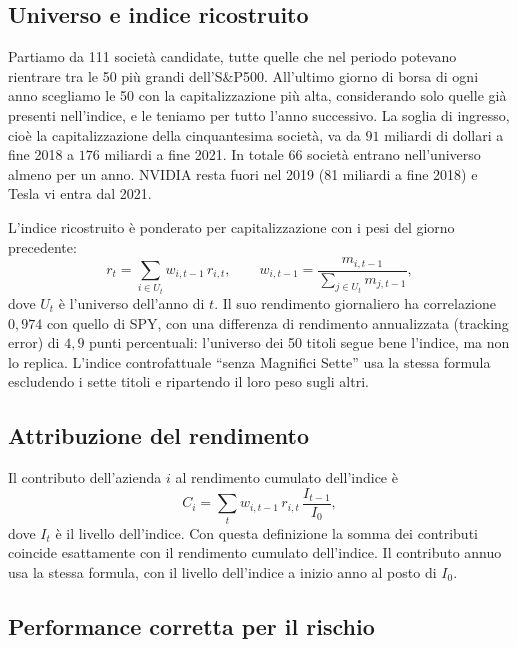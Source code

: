 \documentclass[12pt, a4paper]{article}
\begin{document}
\subsection{Universo e indice ricostruito}

Partiamo da 111 societ\`a candidate, tutte quelle che nel periodo potevano rientrare tra le 50 pi\`u grandi dell'S\&P500. All'ultimo giorno di borsa di ogni anno scegliamo le 50 con la capitalizzazione pi\`u alta, considerando solo quelle gi\`a presenti nell'indice, e le teniamo per tutto l'anno successivo. La soglia di ingresso, cio\`e la capitalizzazione della cinquantesima societ\`a, va da $91$ miliardi di dollari a fine 2018 a $176$ miliardi a fine 2021. In totale 66 societ\`a entrano nell'universo almeno per un anno. NVIDIA resta fuori nel 2019 (81 miliardi a fine 2018) e Tesla vi entra dal 2021.

L'indice ricostruito \`e ponderato per capitalizzazione con i pesi del giorno precedente:
\begin{equation}
  r_t = \sum_{i \in U_t} w_{i,t-1}\, r_{i,t}, \qquad w_{i,t-1} = \frac{m_{i,t-1}}{\sum_{j \in U_t} m_{j,t-1}},
\end{equation}
dove $U_t$ \`e l'universo dell'anno di $t$. Il suo rendimento giornaliero ha correlazione $0{,}974$ con quello di SPY, con una differenza di rendimento annualizzata (tracking error) di $4{,}9$ punti percentuali: l'universo dei 50 titoli segue bene l'indice, ma non lo replica. L'indice controfattuale ``senza Magnifici Sette'' usa la stessa formula escludendo i sette titoli e ripartendo il loro peso sugli altri.

\subsection{Attribuzione del rendimento}
\label{sec:attribuzione}

Il contributo dell'azienda $i$ al rendimento cumulato dell'indice \`e
\begin{equation}
  C_i = \sum_{t} w_{i,t-1}\, r_{i,t}\, \frac{I_{t-1}}{I_0},
\end{equation}
dove $I_t$ \`e il livello dell'indice. Con questa definizione la somma dei contributi coincide esattamente con il rendimento cumulato dell'indice. Il contributo annuo usa la stessa formula, con il livello dell'indice a inizio anno al posto di $I_0$.

\subsection{Performance corretta per il rischio}
\end{document}

